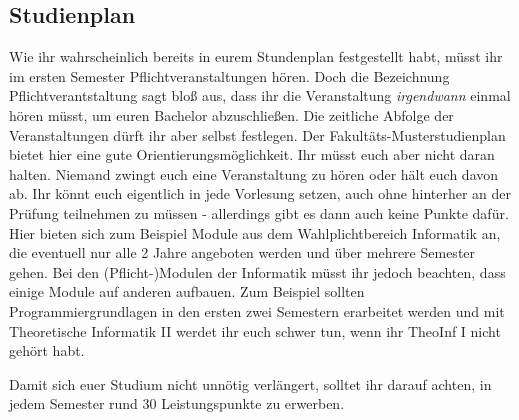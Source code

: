 \subsection{Studienplan}
	\label{bach_studienplan}
	Wie ihr wahrscheinlich bereits in eurem Stundenplan festgestellt habt, müsst ihr im ersten Semester \iftoggle{winter}{vier}{fünf} Pflichtveranstaltungen hören. Doch die Bezeichnung Pflichtverantstaltung sagt bloß aus, dass ihr die Veranstaltung \emph{irgendwann} einmal hören müsst, um euren Bachelor abzuschließen. Die zeitliche Abfolge der Veranstaltungen dürft ihr aber selbst festlegen. Der Fakultäts-Musterstudienplan bietet hier eine gute Orientierungsmöglichkeit. Ihr müsst euch aber nicht daran halten. Niemand zwingt euch eine Veranstaltung zu hören oder hält euch davon ab. Ihr könnt euch eigentlich in jede Vorlesung setzen, auch ohne hinterher an der Prüfung teilnehmen zu müssen - allerdings gibt es dann auch keine Punkte dafür. Hier bieten sich zum Beispiel Module aus dem Wahlplichtbereich Informatik an, die eventuell nur alle 2 Jahre angeboten werden und über mehrere Semester gehen. Bei den (Pflicht-)Modulen der Informatik müsst ihr jedoch beachten, dass einige Module auf anderen aufbauen. Zum Beispiel sollten Programmiergrundlagen in den ersten zwei Semestern erarbeitet werden und mit Theoretische Informatik II werdet ihr euch schwer tun, wenn ihr TheoInf I nicht gehört habt.

	Damit sich euer Studium nicht unnötig verlängert, solltet ihr darauf achten, in jedem Semester rund 30 Leistungspunkte zu erwerben. 
